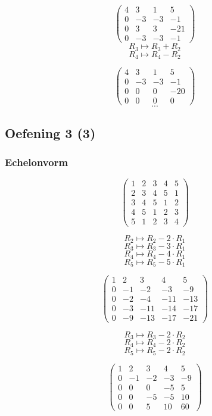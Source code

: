 \documentclass[lineaire_algebra_oplossingen.tex]{subfiles}
\begin{document}
\[
\begin{pmatrix}
4 & 3 & 1 & 5\\
0 & -3 & -3 & -1\\
0 & 3 & 3 & -21\\
0 & -3 & -3 & -1
\end{pmatrix}
\]
\[ R_3 \longmapsto R_3 + R_2\]
\[ R_4 \longmapsto R_4 - R_2\]

\[
\begin{pmatrix}
4 & 3 & 1 & 5\\
0 & -3 & -3 & -1\\
0 & 0 & 0 & -20\\
0 & 0 & 0 & 0
\end{pmatrix}
\]
\[...\]
\subsection{Oefening 3 (3)}
\subsubsection*{Echelonvorm}
\[
\begin{pmatrix}
1 &  2 &  3 &  4 &  5\\
2 &  3 &  4 &  5 &  1\\
3 &  4 &  5 &  1 &  2\\
4 &  5 &  1 &  2 &  3\\
5 &  1 &  2 &  3 &  4 
\end{pmatrix}
\]

\[ R_2 \longmapsto R_2 -2\cdot R_1\]
\[ R_3 \longmapsto R_3 -3\cdot R_1\]
\[ R_4 \longmapsto R_4 -4\cdot R_1\]
\[ R_5 \longmapsto R_5 -5\cdot R_1\]

\[
\begin{pmatrix}
1 &  2 &  3 &  4 &  5 \\
0 & -1 & -2 & -3 & -9 \\
0 & -2 & -4 & -11& -13\\
0 & -3 & -11& -14& -17\\
0 & -9 & -13& -17& -21
\end{pmatrix}
\]

\[ R_3 \longmapsto R_3 -2\cdot R_2\]
\[ R_4 \longmapsto R_4 -2\cdot R_2\]
\[ R_5 \longmapsto R_5 -2\cdot R_2\]

\[
\begin{pmatrix}
1 &  2 &  3 &  4 &  5\\
0 & -1 & -2 & -3 & -9\\
0 &  0 &  0 & -5 &  5\\
0 &  0 & -5 & -5 & 10\\
0 &  0 &  5 & 10 & 60 
\end{pmatrix}
\]
\end{document}
